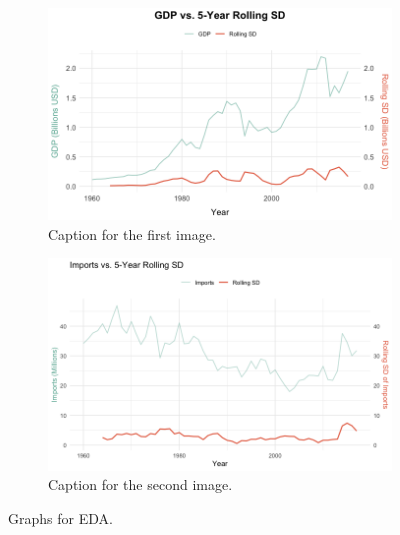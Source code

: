 \documentclass[11pt]{article}
\begin{document}
\begin{figure}[htbp]
  \begin{subfigure}[b]{0.48\textwidth}
    \centering
    \includegraphics[width=\linewidth]{EDA/GDP_RollingSD5.png} %
    \caption{Caption for the first image.}
    \label{fig:side:a}
  \end{subfigure}
  \hfill
  \begin{subfigure}[b]{0.48\textwidth}
    \centering
    \includegraphics[width=\linewidth]{EDA/Imports_RollingSD5.png} %
    \caption{Caption for the second image.}
    \label{fig:side:b}
  \end{subfigure}

  \label{fig:side-by-side}

  \caption{Graphs for EDA.}
\end{figure}
\end{document}
